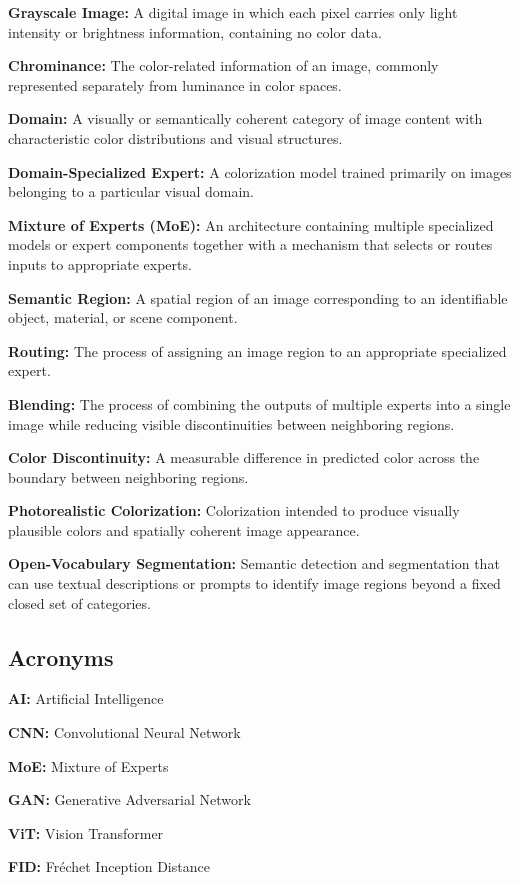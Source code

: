 \documentclass{FastFyp}
\begin{document}
\textbf{Grayscale Image:} A digital image in which each pixel carries only light intensity or brightness information, containing no color data.

\textbf{Chrominance:} The color-related information of an image, commonly represented separately from luminance in color spaces.

\textbf{Domain:} A visually or semantically coherent category of image content with characteristic color distributions and visual structures.

\textbf{Domain-Specialized Expert:} A colorization model trained primarily on images belonging to a particular visual domain.

\textbf{Mixture of Experts (MoE):} An architecture containing multiple specialized models or expert components together with a mechanism that selects or routes inputs to appropriate experts.

\textbf{Semantic Region:} A spatial region of an image corresponding to an identifiable object, material, or scene component.

\textbf{Routing:} The process of assigning an image region to an appropriate specialized expert.

\textbf{Blending:} The process of combining the outputs of multiple experts into a single image while reducing visible discontinuities between neighboring regions.

\textbf{Color Discontinuity:} A measurable difference in predicted color across the boundary between neighboring regions.

\textbf{Photorealistic Colorization:} Colorization intended to produce visually plausible colors and spatially coherent image appearance.

\textbf{Open-Vocabulary Segmentation:} Semantic detection and segmentation that can use textual descriptions or prompts to identify image regions beyond a fixed closed set of categories.
\subsection{Acronyms}
\textbf{AI:} Artificial Intelligence

\textbf{CNN:} Convolutional Neural Network

\textbf{MoE:} Mixture of Experts

\textbf{GAN:} Generative Adversarial Network

\textbf{ViT:} Vision Transformer

\textbf{FID:} Fréchet Inception Distance
\end{document}
